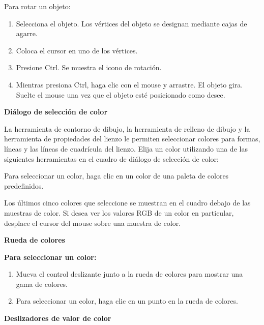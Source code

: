 Para rotar un objeto:
\begin{enumerate}
  \item Selecciona el objeto. Los vértices del objeto se designan mediante cajas de agarre.

\item Coloca el cursor en uno de los vértices.

\item Presione Ctrl. Se muestra el icono de rotación.

\item Mientras presiona Ctrl, haga clic con el mouse y arrastre. El objeto gira. Suelte el mouse una vez que el objeto esté posicionado como desee.
\end{enumerate}

\textbf{Diálogo de selección de color}

La herramienta de contorno de dibujo, la herramienta de relleno de dibujo y la herramienta de propiedades del lienzo le permiten seleccionar colores para formas, líneas y las líneas de cuadrícula del lienzo. Elija un color utilizando una de las siguientes herramientas en el cuadro de diálogo de selección de color:




Para seleccionar un color, haga clic en un color de una paleta de colores predefinidos.

Los últimos cinco colores que seleccione se muestran en el cuadro debajo de las muestras de color. Si desea ver los valores RGB de un color en particular, desplace el cursor del mouse sobre una muestra de color.

\textbf{Rueda de colores}




\textbf{Para seleccionar un color:}

\begin{enumerate}
  \item Mueva el control deslizante junto a la rueda de colores para mostrar una gama de colores.
  
  \item Para seleccionar un color, haga clic en un punto en la rueda de colores.
\end{enumerate}

\textbf{Deslizadores de valor de color}

